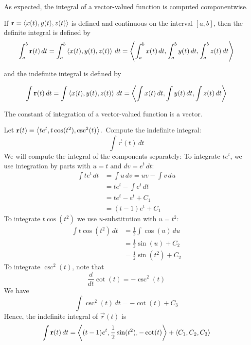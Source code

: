 \documentclass[handout]{ximera}
\begin{document}
As expected, the integral of a vector-valued function is computed componentwise.

\begin{definition}
If $\mathbf r = \left\langle x(t), y(t), z(t)\right\rangle$ is defined and continuous on the interval $[a, b]$, then the definite integral is defined by
\[
\int_a^b \mathbf r(t) \, dt = \int_a^b \left\langle x(t), y(t), z(t)\right\rangle \, dt =  \left\langle \int_a^b x(t) \, dt,\int_a^b  y(t) \, dt,\int_a^b  z(t) \, dt\right\rangle
\]

and the indefinite integral is defined by

\[
\int \mathbf r(t) \, dt = \int\left\langle x(t), y(t), z(t)\right\rangle \, dt =  \left\langle \int x(t) \, dt,\int  y(t) \, dt,\int  z(t) \, dt\right\rangle
\]
\end{definition}

\begin{remark}
The constant of integration of a vector-valued function is a vector.
\end{remark}

\begin{example}[Example 5]
Let $\mathbf r(t) = \left\langle te^t,t\cos(t^2),\csc^2(t)\right\rangle.$ Compute the indefinite integral:
\[
\int \vec r(t) \, dt
\]
We will compute the integral of the components separately:
To integrate $te^t$, we use integration by parts with $u = t$ and $dv = e^t \, dt$:
\begin{align*}
\int te^t \, dt &= \int u \, dv = uv - \int v \, du\\
                 &= te^t - \int e^t \, dt\\
                 & = te^t - e^t + C_1\\
                 & = (t-1)e^t + C_1
\end{align*}
To integrate $t\cos(t^2)$ we use $u$-substitution with $ u = t^2$:
\begin{align*}
\int t\cos(t^2) \, dt &= \frac12 \int \cos(u) \, du \\
                 &= \frac12 \sin(u) + C_2\\
                 & = \frac12 \sin(t^2) + C_2
\end{align*}
To integrate $\csc^2(t)$, note that
\[
\frac{d}{dt} \cot(t) = -\csc^2(t)
\]
We have
\[
\int \csc^2(t) \, dt = -\cot(t) + C_3
\]
Hence, the indefinite integral of $\vec r(t)$ is
\[
\int \mathbf r(t) \, dt = \left\langle (t-1)e^t,\frac12 \sin(t^2),-\cot(t)\right\rangle + \left\langle C_1, C_2, C_3\right\rangle
\]

\end{example}
\end{document}
